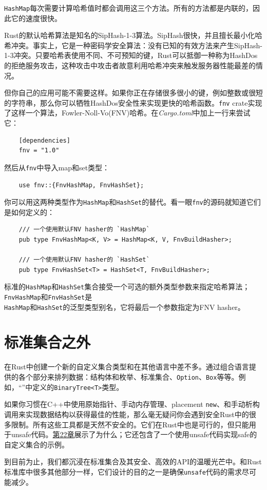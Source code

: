 \texttt{HashMap}每次需要计算哈希值时都会调用这三个方法。所有的方法都是内联的，因此它的速度很快。

Rust的默认哈希算法是知名的SipHash-1-3算法。SipHash很快，并且擅长最小化哈希冲突。事实上，它是一种密码学安全算法：没有已知的有效方法来产生SipHash-1-3冲突。只要哈希表使用不同、不可预知的键，Rust可以抵御一种称为HashDos的拒绝服务攻击，这种攻击中攻击者故意利用哈希冲突来触发服务器性能最差的情况。

但你自己的应用可能不需要这样。如果你正在存储很多很小的键，例如整数或很短的字符串，那么你可以牺牲HashDos安全性来实现更快的哈希函数。\texttt{fnv} crate实现了这样一个算法，Fowler-Noll-Vo(FNV)哈希。在\emph{Cargo.toml}中加上一行来尝试它：
\begin{verbatim}
    [dependencies]
    fnv = "1.0"
\end{verbatim}

然后从\texttt{fnv}中导入map和set类型：
\begin{verbatim}
    use fnv::{FnvHashMap, FnvHashSet};
\end{verbatim}

你可以用这两种类型作为\texttt{HashMap}和\texttt{HashSet}的替代。看一眼\texttt{fnv}的源码就知道它们是如何定义的：
\begin{verbatim}
    /// 一个使用默认FNV hasher的 `HashMap`
    pub type FnvHashMap<K, V> = HashMap<K, V, FnvBuildHasher>;

    /// 一个使用默认FNV hasher的 `HashSet`
    pub type FnvHashSet<T> = HashSet<T, FnvBuildHasher>;
\end{verbatim}

标准的\texttt{HashMap}和\texttt{HashSet}集合接受一个可选的额外类型参数来指定哈希算法；\texttt{FnvHashMap}和\texttt{FnvHashSet}是\\
\texttt{HashMap}和\texttt{HashSet}的泛型类型别名，它将最后一个参数指定为FNV hasher。

\section{标准集合之外}

在Rust中创建一个新的自定义集合类型和在其他语言中差不多。通过组合语言提供的各个部分来排列数据：结构体和枚举、标准集合、\texttt{Option}、\texttt{Box}等等。例如，“”中定义的\texttt{BinaryTree<T>}类型。

如果你习惯在C++中使用原始指针、手动内存管理、placement \texttt{new}、和手动析构调用来实现数据结构以获得最佳的性能，那么毫无疑问你会遇到安全Rust中的很多限制。所有这些工具都是天然不安全的。它们在Rust中也是可行的，但只能用于unsafe代码。\hyperref[ch22]{第22章}展示了为什么；它还包含了一个使用unsafe代码实现safe的自定义集合的示例。

到目前为止，我们都沉浸在标准集合及其安全、高效的API的温暖光芒中。和Rust标准库中很多其他部分一样，它们设计的目的之一是确保\texttt{unsafe}代码的需求尽可能减少。

